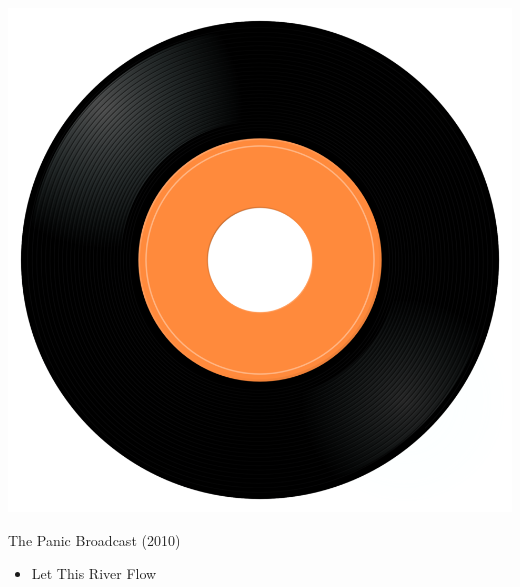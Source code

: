 \begin{minipage}[t]{0.25\textwidth}\vspace{0pt}
\captionsetup{type=figure}
\includegraphics[width=\textwidth]{Images/cover.png}
\caption*{The Panic Broadcast (2010)}
\end{minipage}
\begin{minipage}[t]{0.25\textwidth}\vspace{0pt}
\begin{itemize}[nosep,leftmargin=1em,labelwidth=*,align=left]
	\setlength{\itemsep}{0pt}
	\item Let This River Flow
\end{itemize}
\end{minipage}
